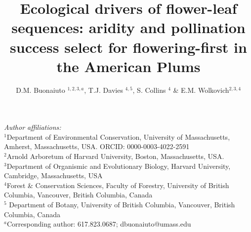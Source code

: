 \documentclass{article}[12pt]
\title{Ecological drivers of flower-leaf sequences: aridity and pollination success select for flowering-first in the American Plums}
\author{D.M. Buonaiuto $^{1,2,3,a}$, T.J. Davies $^{4,5}$, S. Collins $^{4}$ \& E.M. Wolkovich$^{2,3,4}$}
\date{}
\begin{document}

\maketitle
\noindent \emph{Author affiliations:}\\
\noindent $^1$Department of Environmental Conservation, University of Massachusetts, Amherst, Massachusetts, USA. ORCID: 0000-0003-4022-2591\\
\noindent 
$^2$Arnold Arboretum of Harvard University, Boston, Massachusetts, USA.\\
$^3$Department of Organismic and Evolutionary Biology, Harvard University, Cambridge, Massachusetts, USA \\
$^4$Forest \& Conservation Sciences, Faculty of Forestry, University of British Columbia, Vancouver, British Columbia, Canada\\
$^5$ Department of Botany, University of British Columbia, Vancouver, British Columbia, Canada\\
$^a$Corresponding author: 617.823.0687; dbuonaiuto@umass.edu\\

\pagebreak
\end{document}
